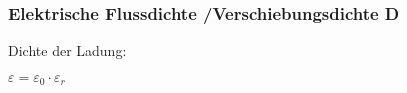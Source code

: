 \subsubsection*{Elektrische Flussdichte /Verschiebungsdichte D}
    \begin{minipage}{0.49\linewidth}
        \begin{center}
            Dichte der Ladung:\\
        \end{center}
    \end{minipage}
    \begin{minipage}{0.49\linewidth}
        \begin{center}
                $\varepsilon = \varepsilon_0 \cdot \varepsilon_r$
        \end{center}
    \end{minipage}
    \vspace{0em}